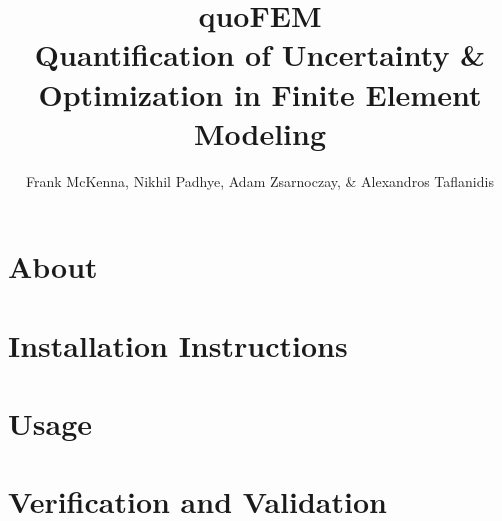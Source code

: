 \documentclass{simcenterdocumentation}
\begin{document}
\title{quoFEM\\ \Large Quantification of Uncertainty \& Optimization in Finite Element Modeling}
\author{Frank McKenna, Nikhil Padhye, Adam Zsarnoczay, \& Alexandros Taflanidis}

\hypersetup{pageanchor=false}
\maketitle
\copyrightpage
\acknowledgments

\hypersetup{pageanchor=true}
\begin{frontmatter}

\pagestyle{plain}
{
  \renewcommand{\thispagestyle}[1]{}
  \tableofcontents
  \clearpage
  \listoffigures
  \clearpage
  \listoftables
}

\end{frontmatter}
\pagestyle{somewhatsimple}

\chapter{About}
\label{chap:about}


\chapter{Installation Instructions}
\label{chap:installation}


\chapter{Usage}
\label{chap:usage}


\chapter{Verification and Validation}
\label{chap:vnv}

\end{document}
